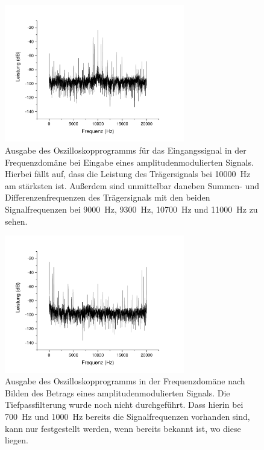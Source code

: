 \documentclass[
a4paper,
12pt,
pagesize,
ngerman
]{scrartcl}
\begin{document}
	\begin{figure}[H]  
		\includegraphics[width=0.7\textwidth]{Origin-Files/AM-Demod-Betrag-Eingang}
		\centering
		\caption{Ausgabe des Oszilloskopprogramms für das Eingangssignal in der Frequenzdomäne bei Eingabe eines amplitudenmodulierten Signals.
		Hierbei fällt auf, dass die Leistung des Trägersignals bei \SI{10000}{\hertz} am stärksten ist. Außerdem sind unmittelbar daneben Summen- und Differenzenfrequenzen des Trägersignals mit den beiden Signalfrequenzen bei \SI{9000}{\hertz}, \SI{9300}{\hertz}, \SI{10700}{\hertz} und \SI{11000}{\hertz} zu sehen.
		}
		\label{fig_tag3_am_demod_eingang}
		\centering
	\end{figure}

	\begin{figure}[H]  
		\includegraphics[width=0.7\textwidth]{Origin-Files/AM-Demod-Betrag-preTP}
		\centering
		\caption{Ausgabe des Oszilloskopprogramms in der Frequenzdomäne nach Bilden des Betrags eines amplitudenmodulierten Signals. Die Tiefpassfilterung wurde noch nicht durchgeführt.
		Dass hierin bei \SI{700}{\hertz} und \SI{1000}{\hertz} bereits die Signalfrequenzen vorhanden sind, kann nur festgestellt werden, wenn bereits bekannt ist, wo diese liegen.
		}
		\label{fig_tag3_am_demod_betrag_preTP}
		\centering
	\end{figure}
\end{document}
